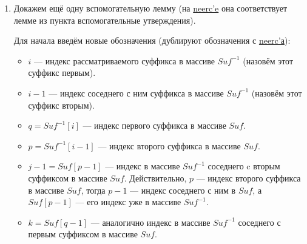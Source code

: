 \begin{enumerate}
       \item Докажем ещё одну вспомогательную лемму (на  \href{https://neerc.ifmo.ru/wiki/index.php?title=%D0%90%D0%BB%D0%B3%D0%BE%D1%80%D0%B8%D1%82%D0%BC_%D0%9A%D0%B0%D1%81%D0%B0%D0%B8_%D0%B8_%D0%B4%D1%80.}{neerc'e}
                она соответствует лемме из пункта вспомогательные утверждения).
                
                Для начала введём новые обозначения (дублируют обозначения с \href{https://neerc.ifmo.ru/wiki/index.php?title=%D0%90%D0%BB%D0%B3%D0%BE%D1%80%D0%B8%D1%82%D0%BC_%D0%9A%D0%B0%D1%81%D0%B0%D0%B8_%D0%B8_%D0%B4%D1%80.}{neerc'а}):
                \begin{itemize}
                        \item $i$ --- индекс рассматриваемого суффикса в массиве $Suf^{-1}$ 
                                (назовём этот суффикс первым).
                        \item $i - 1$ --- индекс соседнего с ним суффикса в массиве $Suf^{-1}$
                                (назовём этот суффикс вторым).
                        \item $q = Suf^{-1}[i]$ --- индекс первого суффикса в массиве $Suf$.
                        \item $p = Suf^{-1}[i - 1]$ --- индекс второго суффикса в массиве $Suf$. 
                        \item $j - 1 = Suf[p - 1]$ --- индекс в массиве $Suf^{-1}$ соседнего c вторым суффиксом
                                в массиве $Suf$. Действительно, $p$ --- индекс второго суффикса в массиве
                                $Suf$, тогда $p - 1$ --- индекс соседнего с ним в $Suf$, а
                                $Suf[p - 1]$ --- его индекс уже в массиве $Suf^{-1}$.
                        \item  $k = Suf[q - 1]$ --- аналогично индекс в массиве $Suf^{-1}$ соседнего с 
                                первым суффиксом в массиве $Suf$.
                \end{itemize}


\end{enumerate}
